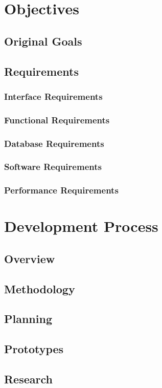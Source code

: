 \documentclass[11pt]{article}
\begin{document}
\section{Objectives}
	\subsection{Original Goals}
	\subsection{Requirements}
		\subsubsection{Interface Requirements}
		\subsubsection{Functional Requirements}
		\subsubsection{Database Requirements}
		\subsubsection{Software Requirements}
		\subsubsection{Performance Requirements}
		
\section{Development Process}
	\subsection{Overview}
	\subsection{Methodology}
	\subsection{Planning}
	\subsection{Prototypes}
	\subsection{Research}
\end{document}
